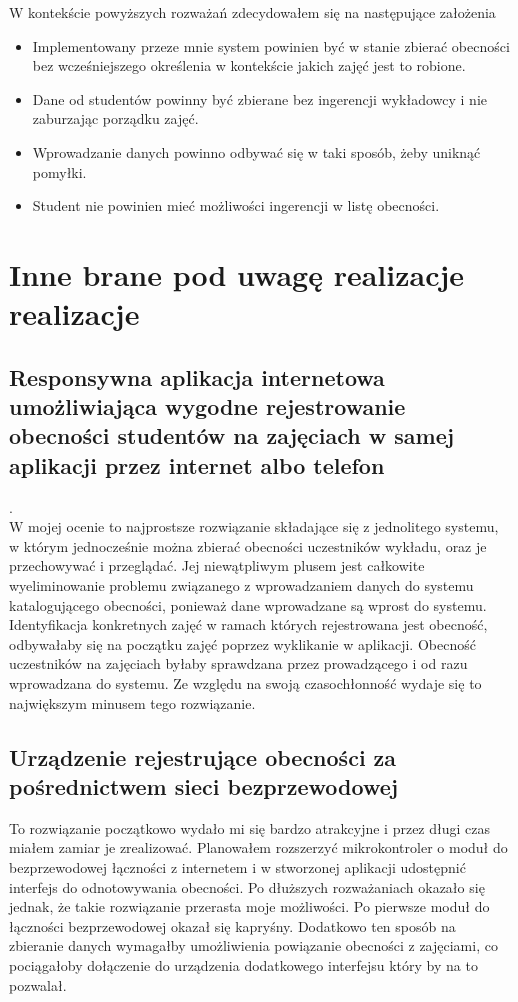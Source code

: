 \documentclass[declaration,shortabstract, mgr]{iithesis}
\begin{document}
\indent W kontekście powyższych rozważań zdecydowałem się na następujące założenia
\begin{itemize}
\item Implementowany przeze mnie system powinien być w stanie zbierać obecności bez wcześniejszego określenia w kontekście jakich zajęć jest to robione.
\item Dane od studentów powinny być zbierane bez ingerencji wykładowcy i nie zaburzając porządku zajęć.
\item Wprowadzanie danych powinno odbywać się w taki sposób, żeby uniknąć pomyłki.
\item Student nie powinien mieć możliwości ingerencji w listę obecności.
\end{itemize}

\section{Inne brane pod uwagę realizacje realizacje}
\subsection{Responsywna aplikacja internetowa umożliwiająca wygodne rejestrowanie obecności studentów na zajęciach w samej aplikacji przez internet albo telefon}. \\
W mojej ocenie to najprostsze rozwiązanie składające się z jednolitego systemu, w którym jednocześnie można zbierać obecności uczestników wykładu, oraz je przechowywać i przeglądać. Jej niewątpliwym plusem jest całkowite wyeliminowanie problemu związanego z wprowadzaniem danych do systemu katalogującego obecności, ponieważ dane wprowadzane są wprost do systemu. Identyfikacja konkretnych zajęć w ramach których rejestrowana jest obecność, odbywałaby się na początku zajęć poprzez wyklikanie w aplikacji. Obecność uczestników na zajęciach byłaby sprawdzana przez prowadzącego i od razu wprowadzana do systemu. Ze względu na swoją czasochłonność wydaje się to największym minusem tego rozwiązanie.
\subsection{Urządzenie rejestrujące obecności za pośrednictwem sieci bezprzewodowej}
To rozwiązanie początkowo wydało mi się bardzo atrakcyjne i przez długi czas miałem zamiar je zrealizować. Planowałem rozszerzyć mikrokontroler o moduł do bezprzewodowej łączności z internetem i w stworzonej aplikacji udostępnić interfejs do odnotowywania obecności. Po dłuższych rozważaniach okazało się jednak, że takie rozwiązanie przerasta moje możliwości. Po pierwsze moduł do łączności bezprzewodowej okazał się kapryśny. Dodatkowo ten sposób na zbieranie danych wymagałby umożliwienia powiązanie obecności z zajęciami, co pociągałoby dołączenie do urządzenia dodatkowego interfejsu który by na to pozwalał.
\end{document}
